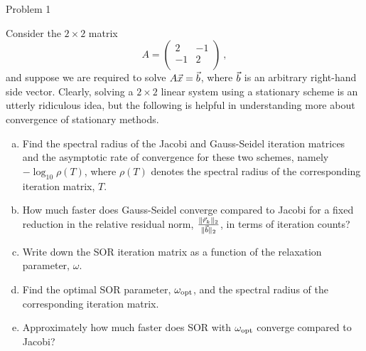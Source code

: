 \begin{section}{Problem 1}

    \begin{problem}{1}
        Consider the $2 \times 2$ matrix
        $$
        A=\left( \begin{array}{cc}
        2 & -1   \\
        -1 & 2  \\
        \end{array} \right)
        \ ,
        $$
        and suppose we are required to solve $A \vec{x}=\vec{b}$, where $\vec{b}$ is an arbitrary right-hand side vector. Clearly, solving a $2
        \times 2$ linear system using a stationary scheme is an utterly ridiculous idea, but the following is helpful in understanding more about convergence of stationary methods.
        \begin{enumerate}[(a)]
            \item Find the spectral radius of the Jacobi and Gauss-Seidel iteration matrices and the asymptotic rate of convergence for these two schemes, namely $-\log_{10} \rho(T)$, where $\rho(T)$ denotes the spectral radius of the corresponding iteration matrix, $T$. 
            \item How much faster does Gauss-Seidel converge compared to Jacobi for a fixed reduction in the relative residual norm, $\frac{\| \vec{r}_k \|_2}{\| \vec{b} \|_2}$, in terms of iteration counts?
            \item Write down the SOR iteration matrix as a function of the relaxation parameter, $\omega$.  
            \item Find the optimal SOR parameter, $\omega_{\rm opt}$, and the spectral radius of the corresponding iteration matrix.
            \item Approximately how much faster does SOR with $\omega_{\rm opt}$ converge compared to Jacobi?
        \end{enumerate}
    \end{problem}


\end{section}
